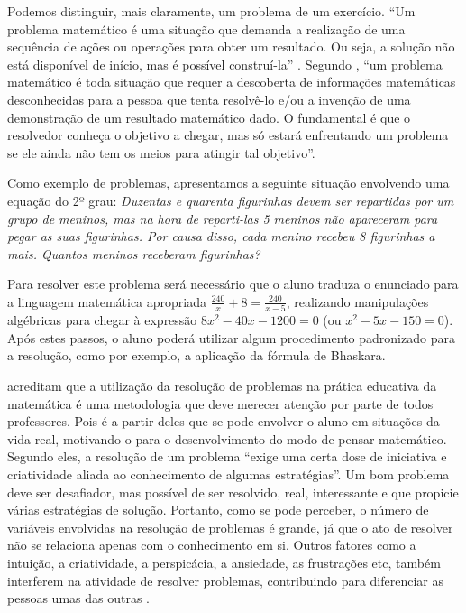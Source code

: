 Podemos distinguir, mais claramente, um problema de um exercício. ``Um problema matemático é uma situação que demanda a 
realização de uma sequência de ações ou operações para obter um resultado. Ou seja, a solução não está disponível de início, mas é
possível construí-la'' \cite[p.~4]{nacionais1998terceiro}. Segundo , ``um problema matemático é toda
situação que requer a descoberta de informações matemáticas desconhecidas para a pessoa que tenta resolvê-lo e/ou a invenção de uma 
demonstração de um resultado matemático dado. O fundamental é que o resolvedor conheça o objetivo a chegar, mas só estará enfrentando um
problema se ele ainda não tem os meios para atingir tal objetivo''. 

Como exemplo de problemas, apresentamos a seguinte situação envolvendo uma equação do 2º grau: \textit{Duzentas e quarenta figurinhas devem 
ser repartidas por um grupo de meninos, mas na hora de reparti-las 5 meninos não apareceram para pegar as suas figurinhas. Por causa disso, 
cada menino recebeu 8 figurinhas a mais. Quantos meninos receberam figurinhas?}

Para resolver este problema será necessário que o aluno traduza o enunciado para a linguagem matemática apropriada $\frac{240}{x} + 8 = 
\frac{240}{x-5}$, realizando manipulações algébricas para chegar à expressão $8x^{2}-40x-1200=0$ (ou $x^{2}-5x-150=0$). Após estes 
passos, o aluno poderá utilizar algum procedimento padronizado para a resolução, como por exemplo, a aplicação da fórmula de Bhaskara.

 acreditam que a utilização da resolução de problemas na pr\'atica educativa da matemática \'e
uma metodologia que deve merecer atenção por parte de todos professores. Pois \'e a partir deles que se pode envolver o aluno em situações 
da vida real, motivando-o para o desenvolvimento do modo de pensar matemático. Segundo eles, a resolução de um problema 
``exige uma certa dose de iniciativa e criatividade aliada ao conhecimento de algumas estratégias''. Um bom problema deve ser 
desafiador, mas possível de ser resolvido, real, interessante e que propicie várias estratégias de solução. Portanto, como se pode 
perceber, o número de variáveis envolvidas na resolução de problemas é grande, já que o ato de resolver não se relaciona apenas 
com o conhecimento em si. Outros fatores como a intuição, a criatividade, a perspicácia, a ansiedade, as frustrações etc, também interferem 
na atividade de resolver problemas, contribuindo para diferenciar as pessoas umas das outras \cite{mirian2001resolucao}. 

